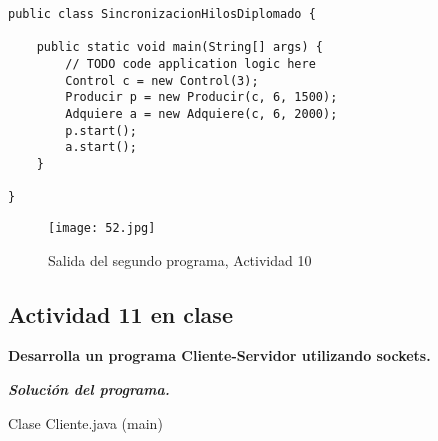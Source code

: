 \begin{verbatim}
public class SincronizacionHilosDiplomado {

    public static void main(String[] args) {
        // TODO code application logic here
        Control c = new Control(3);
        Producir p = new Producir(c, 6, 1500);
        Adquiere a = new Adquiere(c, 6, 2000);
        p.start();
        a.start();
    }
    
}
\end{verbatim} \vspace{1cm}
\begin{figure}[h!]
		\centering
		{\texttt{[image: 52.jpg]}\par} 
		\caption{Salida del segundo programa, Actividad 10}\vspace{1cm}
\end{figure}

{\raggedright
\subsection{Actividad 11 en clase}
}\vspace{.5cm}

\textbf{Desarrolla un programa Cliente-Servidor utilizando sockets.}\vspace{1cm}

\textbf{\textit{Solución del programa.}}\vspace{.5mm}

\begin{center}
Clase Cliente.java (main)
\end{center}

